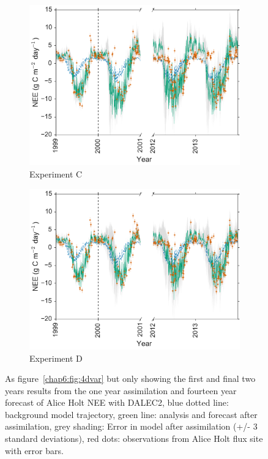 \begin{figure}
\begin{subfigure}[b]{0.49\textwidth}
        \includegraphics[width=\textwidth]{chapter/chapter6/Cbroke4dvar2.pdf}
        \caption{Experiment C}
        \label{chap6:fig:broke4dvarBcorR}
    \end{subfigure}
    \begin{subfigure}[b]{0.49\textwidth}
        \includegraphics[width=\textwidth]{chapter/chapter6/Dbroke4dvar2.pdf}
        \caption{Experiment D}
        \label{chap6:fig:broke4dvaredcBcorR}
    \end{subfigure}
    \caption{As figure~\ref{chap6:fig:4dvar} but only showing the first and final two years results from the one year assimilation and fourteen year forecast of Alice Holt NEE with DALEC2, blue dotted line: background model trajectory, green line: analysis and forecast after assimilation, grey shading: Error in model after assimilation (+/- 3 standard deviations), red dots: observations from Alice Holt flux site with error bars.}\label{chap6:fig:broke4dvar}
\end{figure}

